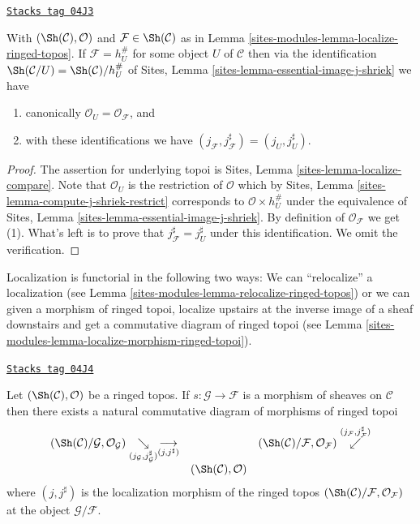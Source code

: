 \begin{lemma}
\label{sites-modules-lemma-localize-compare}
\href{https://stacks.math.columbia.edu/tag/04J3}{\texttt{Stacks tag 04J3}}

With
$(\Sh(\mathcal{C}), \mathcal{O})$ and
$\mathcal{F} \in \Sh(\mathcal{C})$ as in
Lemma \ref{sites-modules-lemma-localize-ringed-topos}.
If $\mathcal{F} = h_U^\#$ for some object $U$ of $\mathcal{C}$
then via the identification
$\Sh(\mathcal{C}/U) = \Sh(\mathcal{C})/h_U^\#$ of
Sites, Lemma \ref{sites-lemma-essential-image-j-shriek}
we have
\begin{enumerate}
\item canonically $\mathcal{O}_U = \mathcal{O}_\mathcal{F}$, and
\item with these identifications
we have $(j_\mathcal{F}, j_\mathcal{F}^\sharp) = (j_U, j_U^\sharp)$.
\end{enumerate}
\end{lemma}

\begin{proof}
The assertion for underlying topoi is
Sites, Lemma \ref{sites-lemma-localize-compare}.
Note that $\mathcal{O}_U$ is the restriction of $\mathcal{O}$
which by
Sites, Lemma \ref{sites-lemma-compute-j-shriek-restrict}
corresponds to $\mathcal{O} \times h_U^\#$ under the equivalence of
Sites, Lemma \ref{sites-lemma-essential-image-j-shriek}.
By definition of $\mathcal{O}_\mathcal{F}$ we get (1).
What's left is to prove that $j_\mathcal{F}^\sharp = j_U^\sharp$
under this identification. We omit the verification.
\end{proof}

Localization is functorial in the following two ways:
We can ``relocalize'' a localization (see
Lemma \ref{sites-modules-lemma-relocalize-ringed-topos})
or we can given a morphism of ringed topoi, localize upstairs at
the inverse image of a sheaf downstairs and get a commutative
diagram of ringed topoi (see
Lemma \ref{sites-modules-lemma-localize-morphism-ringed-topoi}).

\begin{lemma}
\label{sites-modules-lemma-relocalize-ringed-topos}
\href{https://stacks.math.columbia.edu/tag/04J4}{\texttt{Stacks tag 04J4}}

Let $(\Sh(\mathcal{C}), \mathcal{O})$ be a ringed topos.
If $s : \mathcal{G} \to \mathcal{F}$ is a morphism of sheaves
on $\mathcal{C}$ then there exists a natural commutative diagram of
morphisms of ringed topoi
$$
\begin{array}{ccc}(\Sh(\mathcal{C})/\mathcal{G}, \mathcal{O}_\mathcal{G})
\underset{(j_\mathcal{G}, j_\mathcal{G}^\sharp)}{\searrow}\underset{(j, j^\sharp)}{\longrightarrow} &  & (\Sh(\mathcal{C})/\mathcal{F}, \mathcal{O}_\mathcal{F})
\overset{(j_\mathcal{F}, j_\mathcal{F}^\sharp)}{\swarrow} \\  & (\Sh(\mathcal{C}), \mathcal{O}) & \end{array}
$$
where $(j, j^\sharp)$ is the localization morphism of the ringed topos
$(\Sh(\mathcal{C})/\mathcal{F}, \mathcal{O}_\mathcal{F})$
at the object $\mathcal{G}/\mathcal{F}$.
\end{lemma}

